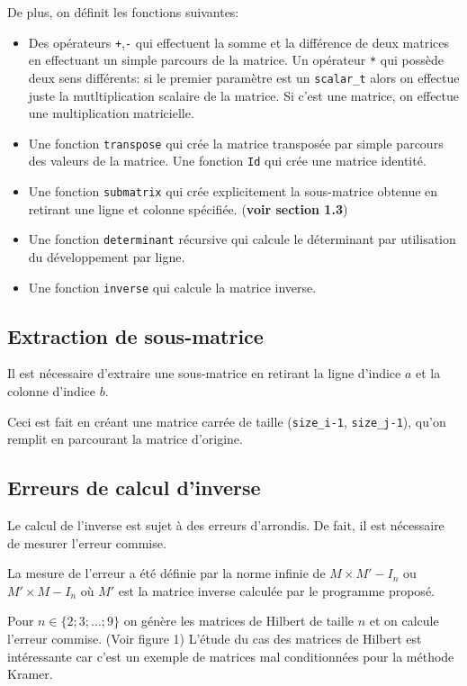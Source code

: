 \documentclass[a4paper,11pt]{article}
\begin{document}
De plus, on définit les fonctions suivantes:

\begin{itemize}
\item Des opérateurs \texttt{+},\texttt{-} qui effectuent la somme et la différence de deux matrices en effectuant un simple parcours de la matrice. Un opérateur \texttt{*} qui possède deux sens différents: si le premier paramètre est un \texttt{scalar\_t} alors on effectue juste la mutltiplication scalaire de la matrice. Si c'est une matrice, on effectue une multiplication matricielle.
\item Une fonction \texttt{transpose} qui crée la matrice transposée par simple parcours des valeurs de la matrice. Une fonction \texttt{Id} qui crée une matrice identité.
\item Une fonction \texttt{submatrix} qui crée explicitement la sous-matrice obtenue en retirant une ligne et colonne spécifiée. (\textbf{voir section 1.3})
\item Une fonction \texttt{determinant} récursive qui calcule le déterminant par utilisation du développement par ligne.
\item Une fonction \texttt{inverse} qui calcule la matrice inverse.
\end{itemize}

\subsection{Extraction de sous-matrice}

Il est nécessaire d'extraire une sous-matrice en retirant la ligne d'indice $a$ et la colonne d'indice $b$. 

Ceci est fait en créant une matrice carrée de taille (\texttt{size\_i-1}, \texttt{size\_j-1}), qu'on remplit en parcourant la matrice d'origine.

\subsection{Erreurs de calcul d'inverse}

Le calcul de l'inverse est sujet à des erreurs d'arrondis. De fait, il est nécessaire de mesurer l'erreur commise.

La mesure de l'erreur a été définie par la norme infinie de $M\times M' - I_n$ ou $M'\times M - I_n$ où $M'$ est la matrice inverse calculée par le programme proposé.

Pour $n \in \{2;3;\dots;9\}$ on génère les matrices de Hilbert de taille $n$ et on calcule l'erreur commise. (Voir figure 1) L'étude du cas des matrices de Hilbert est intéressante car c'est un exemple de matrices mal conditionnées pour la méthode Kramer.
\end{document}
